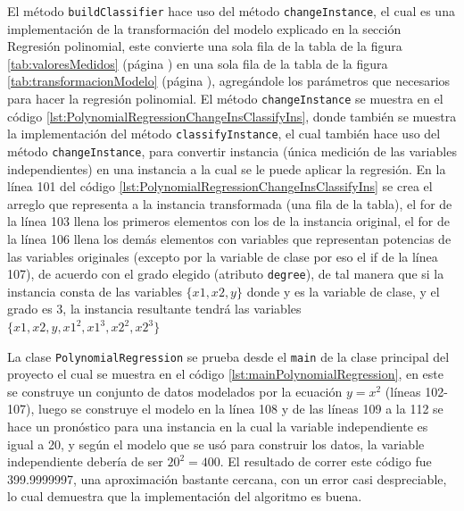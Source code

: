 El método \texttt{buildClassifier} hace uso del método \texttt{changeInstance}, el cual es una implementación de la transformación del modelo explicado en la sección Regresión polinomial, 
este convierte una sola fila de la tabla de la figura \ref{tab:valoresMedidos} (página \pageref{tab:valoresMedidos}) en una sola fila de la tabla de la figura \ref{tab:transformacionModelo} (página \pageref{tab:transformacionModelo}), agregándole los parámetros que necesarios para hacer la regresión polinomial. 
El método \texttt{changeInstance} se muestra en el código \ref{lst:PolynomialRegressionChangeInsClassifyIns}, donde también se muestra la implementación del método \texttt{classifyInstance}, el cual también hace uso del método \texttt{changeInstance}, para convertir instancia (única medición de las variables independientes) en una instancia a la cual se le puede aplicar la regresión.
En la línea 101 del código \ref{lst:PolynomialRegressionChangeInsClassifyIns} se crea el arreglo que representa a la instancia transformada (una fila de la tabla), el for de la línea 103 llena los primeros elementos con los de la instancia original, el for de la línea 106 llena los demás elementos con 
variables que representan potencias de las variables originales (excepto por la variable de clase por eso el if de la línea 107), de acuerdo con el grado elegido (atributo \texttt{degree}), de tal manera que si la instancia consta de las variables $\{x1,x2,y\}$ donde y es la variable de clase, y el grado es 3, la instancia resultante tendrá las variables $\{x1,x2,y,x1^2,x1^3,x2^2,x2^3\}$ 

La clase \texttt{PolynomialRegression} se prueba desde el \texttt{main} de la clase principal del proyecto el cual se muestra en el código \ref{lst:mainPolynomialRegression}, en este se construye un conjunto de datos modelados por la ecuación $y= x^{2}$ (líneas 102-107), luego se construye el modelo en la línea 108 y de las líneas 109 a la 112 se hace un pronóstico para una instancia en la cual la variable independiente es igual a 20, y según el modelo que se usó para construir los datos, la variable independiente debería de ser $20^{2}= 400$.
El resultado de correr este código fue 399.9999997, una aproximación bastante cercana, con un error casi despreciable, lo cual demuestra que la implementación del algoritmo es buena.


